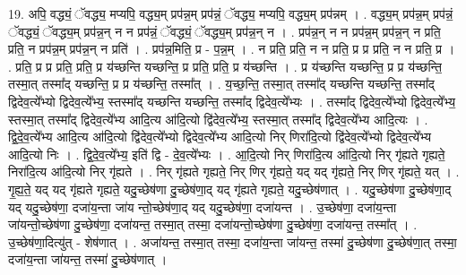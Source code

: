 \documentclass[17pt]{extarticle}
\begin{document}
19. अपि॒ वद्ध्यं॒ ॅवद्ध्य॒ मप्यपि॒ वद्ध्य॒म् प्रप॑न्न॒म् प्रप॑न्नं॒ ॅवद्ध्य॒ मप्यपि॒ वद्ध्य॒म् प्रप॑न्नम् । . वद्ध्य॒म् प्रप॑न्न॒म् प्रप॑न्नं॒ ॅवद्ध्यं॒ ॅवद्ध्य॒म् प्रप॑न्न॒न् न न प्रप॑न्नं॒ ॅवद्ध्यं॒ ॅवद्ध्य॒म् प्रप॑न्न॒न् न । . प्रप॑न्न॒न् न न प्रप॑न्न॒म् प्रप॑न्न॒न् न प्रति॒ प्रति॒ न प्रप॑न्न॒म् प्रप॑न्न॒न् न प्रति॑ । . प्रप॑न्न॒मिति॒ प्र - प॒न्न॒म् । . न प्रति॒ प्रति॒ न न प्रति॒ प्र प्र प्रति॒ न न प्रति॒ प्र । . प्रति॒ प्र प्र प्रति॒ प्रति॒ प्र य॑च्छन्ति यच्छन्ति॒ प्र प्रति॒ प्रति॒ प्र य॑च्छन्ति । . प्र य॑च्छन्ति यच्छन्ति॒ प्र प्र य॑च्छन्ति॒ तस्मा॒त् तस्मा᳚द् यच्छन्ति॒ प्र प्र य॑च्छन्ति॒ तस्मा᳚त् । . य॒च्छ॒न्ति॒ तस्मा॒त् तस्मा᳚द् यच्छन्ति यच्छन्ति॒ तस्मा᳚द् द्विदेव॒त्ये᳚भ्यो द्विदेव॒त्ये᳚भ्य॒ स्तस्मा᳚द् यच्छन्ति यच्छन्ति॒ तस्मा᳚द् द्विदेव॒त्ये᳚भ्यः । . तस्मा᳚द् द्विदेव॒त्ये᳚भ्यो द्विदेव॒त्ये᳚भ्य॒ स्तस्मा॒त् तस्मा᳚द् द्विदेव॒त्ये᳚भ्य आदि॒त्य आ॑दि॒त्यो द्वि॑देव॒त्ये᳚भ्य॒ स्तस्मा॒त् तस्मा᳚द् द्विदेव॒त्ये᳚भ्य आदि॒त्यः । . द्वि॒दे॒व॒त्ये᳚भ्य आदि॒त्य आ॑दि॒त्यो द्वि॑देव॒त्ये᳚भ्यो द्विदेव॒त्ये᳚भ्य आदि॒त्यो निर् णिरा॑दि॒त्यो द्वि॑देव॒त्ये᳚भ्यो द्विदेव॒त्ये᳚भ्य आदि॒त्यो निः । . द्वि॒दे॒व॒त्ये᳚भ्य॒ इति॑ द्वि - दे॒व॒त्ये᳚भ्यः । . आ॒दि॒त्यो निर् णिरा॑दि॒त्य आ॑दि॒त्यो निर् गृ॑ह्यते गृह्यते॒ निरा॑दि॒त्य आ॑दि॒त्यो निर् गृ॑ह्यते । . निर् गृ॑ह्यते गृह्यते॒ निर् णिर् गृ॑ह्यते॒ यद् यद् गृ॑ह्यते॒ निर् णिर् गृ॑ह्यते॒ यत् । . गृ॒ह्य॒ते॒ यद् यद् गृ॑ह्यते गृह्यते॒ यदु॒च्छेष॑णा दु॒च्छेष॑णा॒द् यद् गृ॑ह्यते गृह्यते॒ यदु॒च्छेष॑णात् । . यदु॒च्छेष॑णा दु॒च्छेष॑णा॒द् यद् यदु॒च्छेष॑णा॒ दजा॑य॒न्ता जा॑य न्तो॒च्छेष॑णा॒द् यद् यदु॒च्छेष॑णा॒ दजा॑यन्त । . उ॒च्छेष॑णा॒ दजा॑य॒न्ता जा॑यन्तो॒च्छेष॑णा दु॒च्छेष॑णा॒ दजा॑यन्त॒ तस्मा॒त् तस्मा॒ दजा॑यन्तो॒च्छेष॑णा दु॒च्छेष॑णा॒ दजा॑यन्त॒ तस्मा᳚त् । . उ॒च्छेष॑णा॒दित्यु॑त् - शेष॑णात् । . अजा॑यन्त॒ तस्मा॒त् तस्मा॒ दजा॑य॒न्ता जा॑यन्त॒ तस्मा॑ दु॒च्छेष॑णा दु॒च्छेष॑णा॒त् तस्मा॒ दजा॑य॒न्ता जा॑यन्त॒ तस्मा॑ दु॒च्छेष॑णात् । \newline
\end{document}
